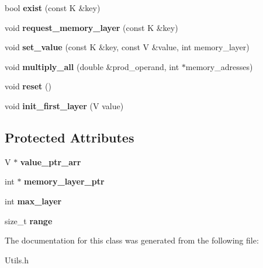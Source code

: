 \begin{DoxyCompactItemize}
\mbox{\label{classEnum__fast__memory__map_aaf4503d857d4f1604349b60389067547}} 
bool {\bfseries exist} (const K \&key)
\item 
\mbox{\label{classEnum__fast__memory__map_a212e70bcf61d38dcb50c3ec7eba3da0f}} 
void {\bfseries request\+\_\+memory\+\_\+layer} (const K \&key)
\item 
\mbox{\label{classEnum__fast__memory__map_a962bd0b3b0a0270cca9c9053c40f8969}} 
void {\bfseries set\+\_\+value} (const K \&key, const V \&value, int memory\+\_\+layer)
\item 
\mbox{\label{classEnum__fast__memory__map_a5b20c600c1f4fd5af350b563077beaee}} 
void {\bfseries multiply\+\_\+all} (double \&prod\+\_\+operand, int $\ast$memory\+\_\+adresses)
\item 
\mbox{\label{classEnum__fast__memory__map_a2ec1969546a9299456933b12bbeb7482}} 
void {\bfseries reset} ()
\item 
\mbox{\label{classEnum__fast__memory__map_a9cce1750aaa19696c6c1566fa611e8ee}} 
void {\bfseries init\+\_\+first\+\_\+layer} (V value)
\end{DoxyCompactItemize}
\subsection*{Protected Attributes}
\begin{DoxyCompactItemize}
\item 
\mbox{\label{classEnum__fast__memory__map_a4da6cc492811180fb2f2d67b212e1958}} 
V $\ast$ {\bfseries value\+\_\+ptr\+\_\+arr}
\item 
\mbox{\label{classEnum__fast__memory__map_ac4d1ca254ac90be516156dc953f21867}} 
int $\ast$ {\bfseries memory\+\_\+layer\+\_\+ptr}
\item 
\mbox{\label{classEnum__fast__memory__map_a25ee5ea5e21c8e55d5b3a4bbdcf3bbf0}} 
int {\bfseries max\+\_\+layer}
\item 
\mbox{\label{classEnum__fast__memory__map_a9ec7fa4ada841d40cdde86a1bf15ce40}} 
size\+\_\+t {\bfseries range}
\end{DoxyCompactItemize}


The documentation for this class was generated from the following file\+:\begin{DoxyCompactItemize}
\item 
Utils.\+h\end{DoxyCompactItemize}
